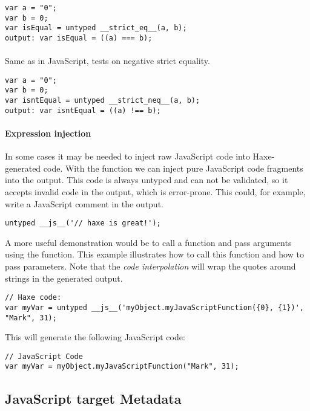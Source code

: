 \begin{lstlisting}
var a = "0";
var b = 0;
var isEqual = untyped __strict_eq__(a, b);
output: var isEqual = ((a) === b);
\end{lstlisting}

\paragraph{} 
Same as   in JavaScript, tests on negative strict equality.

\begin{lstlisting}
var a = "0";
var b = 0;
var isntEqual = untyped __strict_neq__(a, b);
output: var isntEqual = ((a) !== b);
\end{lstlisting}

\paragraph{Expression injection} 

In some cases it may be needed to inject raw JavaScript code into Haxe-generated code. With the  function we can inject pure JavaScript code fragments into the output. This code is always untyped and can not be validated, so it accepts invalid code in the output, which is error-prone.
This could, for example, write a JavaScript comment in the output.

\begin{lstlisting}
untyped __js__('// haxe is great!');
\end{lstlisting}

A more useful demonstration would be to call a function and pass  arguments using the  function. This example illustrates how to call this function and how to pass parameters. Note that the \emph{code interpolation} will wrap the quotes around strings in the generated output.

\begin{lstlisting}
// Haxe code:
var myVar = untyped __js__('myObject.myJavaScriptFunction({0}, {1})', "Mark", 31);
\end{lstlisting}

This will generate the following JavaScript code:
\begin{lstlisting}
// JavaScript Code
var myVar = myObject.myJavaScriptFunction("Mark", 31);
\end{lstlisting}


\subsection{JavaScript target Metadata}
\label{target-javascript-metadata}

